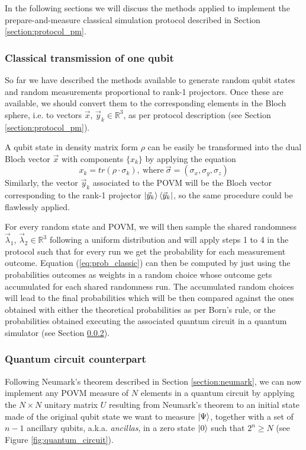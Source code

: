 In the following sections we will discuss the methods applied to implement the prepare-and-measure classical simulation protocol described in Section \ref{section:protocol_pm}.
\subsubsection{Classical transmission of one qubit}
So far we have described the methods available to generate random qubit states and random measurements proportional to rank-1 projectors. Once these are available, we should convert them to the corresponding elements in the Bloch sphere, i.e. to vectors $\vec{x}$, ${\vec{y}_k} \in \mathbb{R}^3$, as per protocol description (see Section \ref{section:protocol_pm}). 

A qubit state in density matrix form $\rho$ can be easily be transformed into the dual Bloch vector $\vec{x}$ with components $\{x_k\}$ by applying the equation
\begin{equation}
    x_k = tr(\rho \cdot \sigma_k),\ \text{where}\ \vec{\sigma} = (\sigma_x, \sigma_y, \sigma_z)
\end{equation}
Similarly, the vector ${\vec{y}_k}$ associated to the POVM will be the Bloch vector corresponding to the rank-1 projector $ \ket{\vec{y}_k} \bra{\vec{y}_k}$, so the same procedure could be flawlessly applied.

For every random state and POVM, we will then sample the shared randomness $\vec{\lambda}_1$, $\vec{\lambda}_2 \in \mathbb{R}^3$ following a uniform distribution and will apply steps 1 to 4 in the protocol such that for every run we get the probability for each measurement outcome. Equation (\ref{eq:prob_classic}) can then be computed by just using the probabilities outcomes as weights in a random choice whose outcome gets accumulated for each shared randomness run. The accumulated random choices will lead to the final probabilities which will be then compared against the ones obtained with either the theoretical probabilities as per Born's rule, or the probabilities obtained executing the associated quantum circuit in a quantum simulator (see Section \ref{section:quantum_circuit}).

\subsubsection{Quantum circuit counterpart}\label{section:quantum_circuit}
Following Neumark's theorem described in Section \ref{section:neumark}, we can now implement any POVM measure of $N$ elements in a quantum circuit by applying the $N\times N$ unitary matrix $U$ resulting from Neumark's theorem to an initial state made of the original qubit state we want to measure $\ket{\Psi}$, together with a set of $n-1$ ancillary qubits, a.k.a. \textit{ancillas}, in a zero state $\ket{0}$ such that $2^n \ge N$ (see Figure \ref{fig:quantum_circuit}). 

